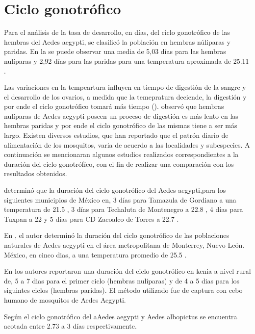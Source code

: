 
\section{Ciclo gonotrófico}

Para el análisis de la tasa de desarrollo, en días, del ciclo gonotrófico de las hembras del Aedes
aegypti, se clasificó la población en hembras núliparas y paridas. En la
 se puede observar una media de 5,03 días para las hembras
nulíparas y  2,92 días para las paridas para una temperatura aproximada de 25.11 \textcelsius.

Las variaciones en la tempeartura influyen en tiempo de digestión de la sangre y el
desarrollo de los ovarios, a medida que la temepratura deciende, la digestión y por ende el ciclo
gonotrófico tomará más tiempo ().
\cite{edman1987host} observó que hembras nulíparas de Aedes aegypti poseen un proceso de digestión
es más lento en las hembras paridas y por ende el ciclo gonotrófico de las mismas tiene a ser más
largo. Existen diversos estudios, que han reportado que el patrón diario de alimentación de los
mosquitos, varia de acuerdo a las localidades y subespecies. A continuación se mencionaran algunos
estudios realizados correspondientes a la duración del ciclo  gonotrófíco, con el fin de realizar
una comparación con los resultados obtenidos.

\cite{beltran2001bionomia} determinó que la duración del ciclo gonotrófico del Aedes aegypti,para
los siguientes municipios de México en, 3 días para Tamazula de Gordiano a una temperatura de 21.5
\textcelsius, 3 días para Techaluta de Montenegro a  22.8 \textcelsius, 4 días para Tuxpan a 22
\textcelsius y 5 días para CD Zacoalco de Torres a 22.7 \textcelsius.

En \cite{luevano1993ciclo}, el autor determinó la duración del ciclo gonotrófico de las
poblaciones naturales de Aedes aegypti en el área metropolitana de Monterrey, Nuevo León. México,
en cinco dias, a una temperatura promedio de 25.5 \textcelsius.

En \cite{trpis1986dispersal} los autores reportaron una duración del ciclo gonotrófico en kenia a
nivel rural de, 5 a 7 dias para el primer ciclo (hembras nulíparas) y de 4 a 5 dias para los
siguintes ciclos (hembras paridas). El método utilizado fue de captura con cebo humano de
mosquitos de Aedes Aegypti.

Según \cite{sivanathan2006ecology} el ciclo gonotrófico del aAedes aegypti y Aedes albopictus se
encuentra acotada entre 2.73 a 3 días respectivamente.

